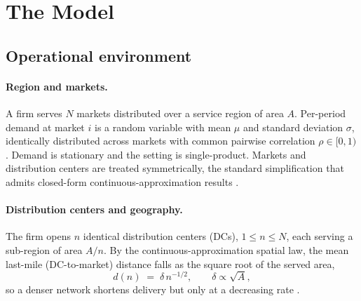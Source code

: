\documentclass[11pt]{article}
\theoremstyle{definition}
\theoremstyle{remark}
\theoremstyle{plain}
\begin{document}
\section{The Model}\label{sec:model}

\subsection{Operational environment}

\paragraph{Region and markets.} A firm serves $N$ markets distributed over a service region of area $A$.
Per-period demand at market $i$ is a random variable with mean $\mu$ and standard deviation $\sigma$,
identically distributed across markets with common pairwise correlation $\rho \in [0,1)$. Demand is
stationary and the setting is single-product. Markets and distribution centers are treated symmetrically, the standard
simplification that admits closed-form continuous-approximation results \citep{daganzo2005logistics}.


\paragraph{Distribution centers and geography.} The firm opens $n$ identical distribution centers (DCs), $1 \le n \le N$, each
serving a sub-region of area $A/n$. By the continuous-approximation spatial law, the mean last-mile
(DC-to-market) distance falls as the square root of the served area,
\begin{equation}\label{eq:dn}
  d(n) \;=\; \delta\, n^{-1/2}, \qquad \delta \propto \sqrt{A},
\end{equation}
so a denser network shortens delivery but only at a decreasing rate \citep{daganzo2005logistics}.
\end{document}
